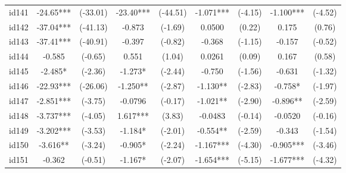 \documentclass[entropy,article,submit,moreauthors,LaTeX and dvi2pdf]{Definitions/mdpi}
\begin{document}
\begin{center}
\begin{longtable}{ccccccccc}
id141                                         & -24.65***     & (-33.01)      & -23.40***       & (-44.51)         & -1.071***         & (-4.15)           & -1.100***         & (-4.52)           \\
id142                                         & -37.04***     & (-41.13)      & -0.873          & (-1.69)          & 0.0500            & (0.22)            & 0.175             & (0.76)            \\
id143                                         & -37.41***     & (-40.91)      & -0.397          & (-0.82)          & -0.368            & (-1.15)           & -0.157            & (-0.52)           \\
id144                                         & -0.585        & (-0.65)       & 0.551           & (1.04)           & 0.0261            & (0.09)            & 0.167             & (0.58)            \\
id145                                         & -2.485*       & (-2.36)       & -1.273*         & (-2.44)          & -0.750            & (-1.56)           & -0.631            & (-1.32)           \\
id146                                         & -22.93***     & (-26.06)      & -1.250**        & (-2.87)          & -1.130**          & (-2.83)           & -0.758*           & (-1.97)           \\
id147                                         & -2.851***     & (-3.75)       & -0.0796         & (-0.17)          & -1.021**          & (-2.90)           & -0.896**          & (-2.59)           \\
id148                                         & -3.737***     & (-4.05)       & 1.617***        & (3.83)           & -0.0483           & (-0.14)           & -0.0520           & (-0.16)           \\
id149                                         & -3.202***     & (-3.53)       & -1.184*         & (-2.01)          & -0.554**          & (-2.59)           & -0.343            & (-1.54)           \\
id150                                         & -3.616**      & (-3.24)       & -0.905*         & (-2.24)          & -1.167***         & (-4.30)           & -0.905***         & (-3.46)           \\
id151                                         & -0.362        & (-0.51)       & -1.167*         & (-2.07)          & -1.654***         & (-5.15)           & -1.677***         & (-4.32)           \\

\end{longtable}
\end{center}
\end{document}
